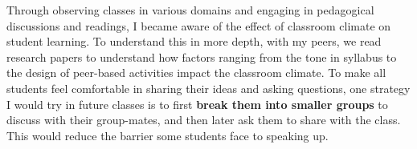 \documentclass[10pt]{article}
\begin{document}



Through observing classes in various domains and engaging in pedagogical discussions and readings, I became aware of the effect of classroom climate on student learning. To understand this in more depth, with my peers, we read research papers to understand how factors ranging from the tone in syllabus to the design of peer-based activities impact the classroom climate. 
To make all students feel comfortable in sharing their ideas and asking questions, one strategy I would try in future classes is to first \textbf{break them into smaller groups} to discuss with their group-mates, and then later ask them to share with the class. This would reduce the barrier some students face to speaking up. %
\end{document}
